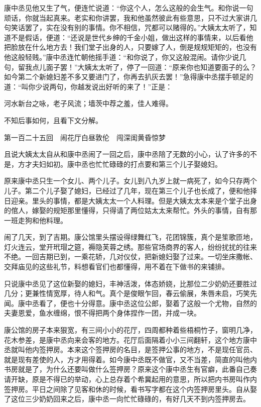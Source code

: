 \documentclass[12pt,UTF8]{ctexbook}
\begin{document}
{{{康中丞见他又生了气，便连忙说道：“你这个人，怎么这般的会生气。和你说一句顽话，你就当起真来。老实和你讲罢，我和他虽然彼此有些意思，只不过大家讲几句笑话罢了，实在没有别的事情。你不相信，咒都可以赌得的。”大姨太太听了，知道不是假话，便道：“还说是世代乡绅的千金小姐，做出这样的事情来，以后看他把脸放在什么地方去！我们堂子出身的人，只要嫁了人，倒是规规矩矩的，也没有他这般轻贱。”康中丞连忙朝他摇手道：“和你说了，你又这般混闹。请你少说几句，留我点儿面子罢！”大姨太太听了，停了一回道：“原来你也知道要面子的么？如今第二个新媳妇差不多又要进门了，你再去扒灰去罢！”急得康中丞摆手顿足的道：“叫你少说两句，你越发说出好听的来了！”正是：

河水新台之咏，老子风流；墙茨中荐之羞，佳人难得。

不知后事如何，且看下文分解。





第一百二十五回　闹花厅白昼敦伦　闯深闺黄昏惊梦





且说大姨太太自从和康中丞闹了一回之后，康中丞陪了无数的小心，认了许多的不是，方才夫妇如初。康中丞也忙忙碌碌的打点要和第三个儿子娶媳妇。

原来康中丞只生一个女儿、两个儿子。女儿到八九岁上就一病死了，如今只存两个儿子。第二个儿子娶了媳妇，已经过了几年，现在第三个儿子也长成了，便和他择日迎亲。里头的事情，都是大姨太太一个人料理。但是大姨太太本来是个堂子出身的倌人，嫁娶的规矩那里懂得，只得请了两位姑太太来帮忙。外头的事情，自有那一班走狗和他料理。

闹了几天，到了吉期。康公馆里头摆设得绿舞红飞，花团锦簇，真个是笙歌匝地，灯火连云，堂开玳瑁之筵，褥隐芙蓉之绣。那些官场商界的客人，纷纷扰扰的往来不绝。一回吉期已到，一乘花轿，几对仪仗，把新媳妇娶了过来。一切坐床撒帐、交拜庙见的这些礼节，料想看官们也都懂得，用不着在下做书的来铺排。

只说康中丞见了这位新娶的媳妇，丰神活泼，体态娇娆，比那位二少奶奶还要胜过几分；更兼性情宽厚，待人和气。真个是俊眼乍回，春云偷展，朱唇未启，巧笑先闻。康中丞看了，便也十分得意。康中丞这位公郎，娶着了这般一个尤物，自然的夫妻恩爱，鱼水缠绵，恨不得把两个身体捏作一团，并成一块。

康公馆的房子本来狠宽，有三间小小的花厅，四周都种着些梧桐竹子，窗明几净，花木参差，是康中丞向来会客的地方。花厅后面隔着小小三间翻轩，这个地方康中丞就叫他内签押房。本来这个签押房的名目，是签押公事的地方，不是现任官员、就是现有差使的人，方才用得着。如今康中丞既不做官，又不当差，简直的叫他内书房就是了，为什么还要叫做什么签押房？原来这个康中丞生有官癖，此番自己奏请开缺，原是不得已的举动，心上总存着个希冀起用的意思，所以把内书房叫作内签押房。平日之间除了见客和休的时候，看书写字都在这个内签押房里头。自从娶了这位三少奶奶回来之后，康中丞一向忙忙碌碌的，有好几天不到内签押房去。

}}}
\end{document}
